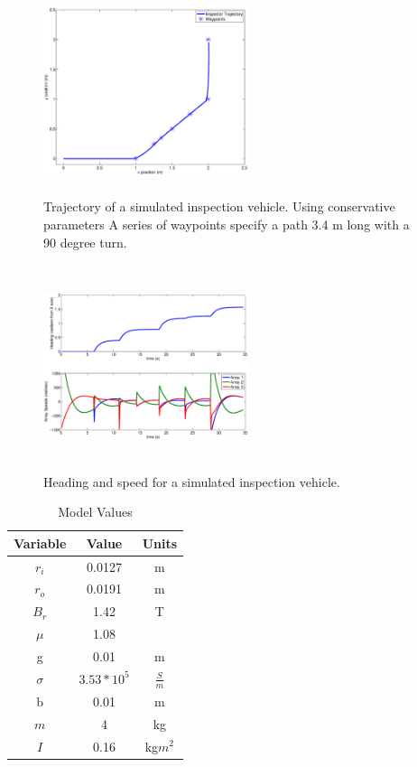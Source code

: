 \begin{figure}

\includegraphics[width = 6cm, height = 6cm ]{figures/sim_trajectory.eps}
\caption{Trajectory of a simulated inspection vehicle. Using conservative parameters A series of waypoints specify a path 3.4 m long with a 90 degree turn. }
\label{fig:trajectory}
\end{figure}

\begin{figure}

\includegraphics[width = 6cm, height = 6cm ]{figures/heading_and_control_sim.eps}
\caption{Heading and speed for a simulated inspection vehicle. }
\label{fig:theta_and_speeds}
\end{figure}



\begin{table}[ht]
\caption{Model Values} %
\centering %
\begin{tabular}{c c c} %
\hline\hline %
Variable & Value & Units\\ [0.5ex] %
\hline

$r_i$ & 0.0127 & m\\  
$r_o$ & 0.0191 & m \\
$B_r$ & 1.42 & T \\
$\mu$ & 1.08 & \\
g & 0.01 & m\\

$\sigma$ & $3.53 * 10^5$ & $\frac{S}{m}$ \\
b & 0.01 & m\\
$m$ & 4 & kg \\
$I$ & 0.16 & kg$m^2$

 \\ [1ex] %
\hline %
\end{tabular}
\label{table:values} %
\end{table}


